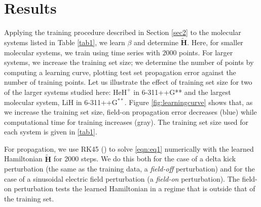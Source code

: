 \documentclass[10pt]{article}
\newcommand{\heh}{\ensuremath{\text{HeH}^+} }
\newcommand{\lih}{\ensuremath{\text{LiH}} }
\begin{document}



\section{Results}\label{sec4}

Applying the training procedure described in Section \ref{sec2} to the molecular systems listed in Table \ref{tab1}, we learn $\beta$ and determine $\widetilde{\mathbf{H}}$. Here, for smaller molecular systems, we train using time series with $2000$ points. For larger systems, we increase the training set size; we determine the number of points by computing a learning curve, plotting test set propagation error against the number of training points. Let us illustrate the effect of training set size for two of the larger systems studied here: \heh in 6-311++G** and the largest molecular system, \lih in 6-311++G$^{**}$. Figure \ref{fig:learningcurve} shows that, as we increase the training set size, field-on propagation error decreases (blue) while computational time for training increases (gray).  The training set size used for each system is given in \ref{tab1}.

For propagation, we use RK45 (\cite{dormand1980}) to solve \eqref{eqn:eq1} numerically with the learned Hamiltonian $\widetilde{\mathbf{H}}$ for 2000 steps.  We do this both for the case of a delta kick perturbation (the same as the training data, a \emph{field-off} perturbation) and for the case of a sinusoidal electric field perturbation (a \emph{field-on} perturbation). The field-on perturbation tests the learned Hamiltonian in a regime that is outside that of the training set. 
\end{document}
